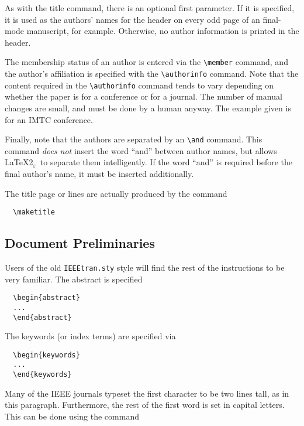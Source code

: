 \documentclass[%
	final,
	reprint,
	notitlepage,
	narroweqnarray,
	inline,
	twoside,
        invited,
	]{ieee}
\newcommand{\latexiie}{\LaTeX2{\Large$_\varepsilon$}}
\begin{document}
As with the title command, there is an optional first parameter. If it
is specified, it is used as the authors' names for the header on every
odd page of an final-mode manuscript, for example.  Otherwise, no
author information is printed in the header.

The membership status of an author is entered via the 
\verb|\member| command, and the author's affiliation is specified
with the \verb|\authorinfo| command.  Note that the content required
in the \verb|\authorinfo| command tends to vary depending on whether
the paper is for a conference or for a journal. The number of manual
changes are small, and must be done by a human anyway. The example
given is for an IMTC conference.

Finally, note that the authors are separated by an \verb|\and|
command.  This command \emph{does not} insert the word ``and'' between
author names, but allows \latexiie\ to separate them intelligently. If
the word ``and'' is required before the final author's name, it must
be inserted additionally.

The title page or lines are actually produced by the command
\begin{verbatim}
  \maketitle
\end{verbatim}

\subsection{Document Preliminaries}

Users of the old \texttt{IEEEtran.sty} style will find the rest of the
instructions to be very familiar. The abstract is specified
\begin{verbatim}
  \begin{abstract} 
  ...
  \end{abstract}
\end{verbatim}
The keywords (or index terms) are specified via
\begin{verbatim}
  \begin{keywords}
  ...
  \end{keywords}
\end{verbatim}

\PARstart Many of the IEEE journals typeset the first character to be
two lines tall, as in this paragraph. Furthermore, the rest of the
first word is set in capital letters. This can be done using the
command
\end{document}
